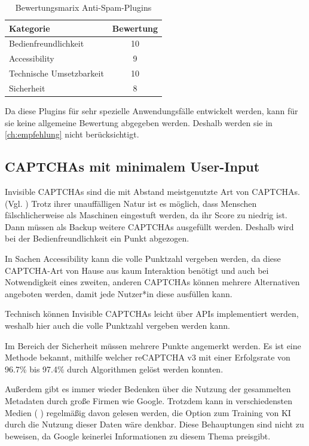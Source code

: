 \begin{table}[h!]
    \caption{Bewertungsmarix Anti-Spam-Plugins}
    \begin{center}
        \begin{tabular}{l|c}
            Kategorie                       & Bewertung \\\hline
            Bedienfreundlichkeit            & 10         \\
            Accessibility                   & 9        \\
            Technische Umsetzbarkeit        & 10         \\
            Sicherheit                      & 8         
        \end{tabular}
    \end{center}
\end{table} 

Da diese Plugins für sehr spezielle Anwendungsfälle entwickelt werden,
kann für sie keine allgemeine Bewertung abgegeben werden.
Deshalb werden sie in \autoref{ch:empfehlung} nicht berücksichtigt.

\subsection{CAPTCHAs mit minimalem User-Input}
Invisible CAPTCHAs sind die mit Abstand meistgenutzte Art von CAPTCHAs. (Vgl. \cite{stats})
Trotz ihrer unauffälligen Natur ist es möglich, dass Menschen fälschlicherweise als Maschinen eingestuft werden,
da ihr Score zu niedrig ist. 
Dann müssen als Backup weitere CAPTCHAs ausgefüllt werden.
Deshalb wird bei der Bedienfreundlichkeit ein Punkt abgezogen.

In Sachen Accessibility kann die volle Punktzahl vergeben werden,
da diese CAPTCHA-Art von Hause aus kaum Interaktion benötigt und auch bei Notwendigkeit eines zweiten, anderen CAPTCHAs
können mehrere Alternativen angeboten werden, damit jede Nutzer*in diese ausfüllen kann.

Technisch können Invisible CAPTCHAs leicht über APIs implementiert werden, weshalb hier auch die volle Punktzahl vergeben werden kann.

Im Bereich der Sicherheit müssen mehrere Punkte angemerkt werden.
Es ist eine Methode bekannt, mithilfe welcher reCAPTCHA v3 mit einer Erfolgsrate von 96.7\% bis 97.4\% durch Algorithmen gelöst werden konnten.
\cite{DBLP:journals/corr/abs-1903-01003}

Außerdem gibt es immer wieder Bedenken über die Nutzung der gesammelten Metadaten durch große Firmen wie Google.
Trotzdem kann in verschiedensten Medien (\cite{sueddt} \cite{hackernoon} \cite{towardsdatascience}) regelmäßig davon gelesen werden,
die Option zum Training von KI durch die Nutzung dieser Daten wäre denkbar.
Diese Behauptungen sind nicht zu beweisen, da Google keinerlei Informationen zu diesem Thema preisgibt.

